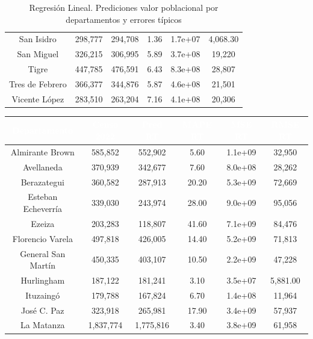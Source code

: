 \documentclass{article}
\theoremstyle{mytheoremstyle}
\theoremstyle{mytheoremstyle}
\theoremstyle{myproblemstyle}
\begin{document}
\begin{table}[htb!]
\begin{tabular}{|c|c|c|c|c|c|}
  San Isidro & 298,777 & 294,708 & 1.36 & 1.7e+07 & 4,068.30 \\
  San Miguel & 326,215 & 306,995 & 5.89 & 3.7e+08 & 19,220 \\
  Tigre & 447,785 & 476,591 & 6.43 & 8.3e+08 & 28,807 \\
  Tres de Febrero & 366,377 & 344,876 & 5.87 & 4.6e+08 & 21,501 \\
  Vicente López & 283,510 & 263,204 & 7.16 & 4.1e+08 & 20,306 \\
  \hline
  \end{tabular}
  \caption{ Regresión Lineal. Prediciones valor poblacional por departamentos y errores típicos}
  \label{tab:LRResults}
  \end{table}
  

\begin{table}[htb!]
    \centering
    \begin{tabular}{|c|c|c|c|c|c|}
    \hline
    \textbf{\cellcolor[rgb]{0,0.231,0.427}\textcolor{white}{Departamento}} & \textbf{\cellcolor[rgb]{0,0.231,0.427}\textcolor{white}{Censo 2022}} & \textbf{\cellcolor[rgb]{0,0.231,0.427}\textcolor{white}{Pred RT}} & \textbf{\cellcolor[rgb]{0,0.231,0.427}\textcolor{white}{MAPE RT}} & \textbf{\cellcolor[rgb]{0,0.231,0.427}\textcolor{white}{MSE RT}} & \textbf{\cellcolor[rgb]{0,0.231,0.427}\textcolor{white}{RMSE RT}} \\ \hline
    Almirante Brown & 585,852 & 552,902 & 5.60 & 1.1e+09 & 32,950 \\
    Avellaneda & 370,939 & 342,677 & 7.60 & 8.0e+08 & 28,262 \\
    Berazategui & 360,582 & 287,913 & 20.20 & 5.3e+09 & 72,669 \\
    Esteban Echeverría & 339,030 & 243,974 & 28.00 & 9.0e+09 & 95,056 \\
    Ezeiza & 203,283 & 118,807 & 41.60 & 7.1e+09 & 84,476 \\
    Florencio Varela & 497,818 & 426,005 & 14.40 & 5.2e+09 & 71,813 \\
    General San Martín & 450,335 & 403,107 & 10.50 & 2.2e+09 & 47,228 \\
    Hurlingham & 187,122 & 181,241 & 3.10 & 3.5e+07 & 5,881.00 \\
    Ituzaingó & 179,788 & 167,824 & 6.70 & 1.4e+08 & 11,964 \\
    José C. Paz & 323,918 & 265,981 & 17.90 & 3.4e+09 & 57,937 \\
    La Matanza & 1,837,774 & 1,775,816 & 3.40 & 3.8e+09 & 61,958 \\

\end{tabular}
\end{table}
\end{document}
